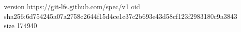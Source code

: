 version https://git-lfs.github.com/spec/v1
oid sha256:6d754245a07a2758c2644f15d4ce1c37c2b693e43d58cf123f2983180c9a3843
size 174940
